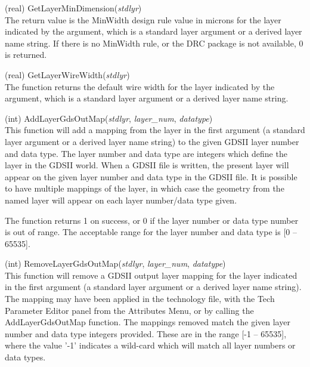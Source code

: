 \begin{description}
\item{(real) \vt GetLayerMinDimension({\it stdlyr\/})}\\
The return value is the {\vt MinWidth} design rule value in microns
for the layer indicated by the argument, which is a standard layer
argument or a derived layer name string.  If there is no {\vt
MinWidth} rule, or the DRC package is not available, 0 is returned.

\item{(real) \vt GetLayerWireWidth({\it stdlyr\/})}\\
The function returns the default wire width for the layer indicated by
the argument, which is a standard layer argument or a derived layer
name string.

\item{(int) \vt AddLayerGdsOutMap({\it stdlyr\/}, {\it layer\_num\/},
  {\it datatype\/})}\\
This function will add a mapping from the layer in the first argument
(a standard layer argument or a derived layer name string) to the given
GDSII layer number and data type.  The layer number and data type are
integers which define the layer in the GDSII world.  When a GDSII file
is written, the present layer will appear on the given layer number
and data type in the GDSII file.  It is possible to have multiple
mappings of the layer, in which case the geometry from the named layer
will appear on each layer number/data type given.

The function returns 1 on success, or 0 if the layer number or
data type number is out of range.  The acceptable range for the
layer number and data type is [0 -- 65535].

\item{(int) \vt RemoveLayerGdsOutMap({\it stdlyr\/}, {\it layer\_num\/},
  {\it datatype\/})}\\
This function will remove a GDSII output layer mapping for the layer
indicated in the first argument (a standard layer argument or a
derived layer name string).  The mapping may have been applied in the
technology file, with the {\cb Tech Parameter Editor} panel from the
{\cb Attributes Menu}, or by calling the {\vt AddLayerGdsOutMap}
function.  The mappings removed match the given layer number and data
type integers provided.  These are in the range [-1 -- 65535], where
the value '-1' indicates a wild-card which will match all layer
numbers or data types.


\end{description}
